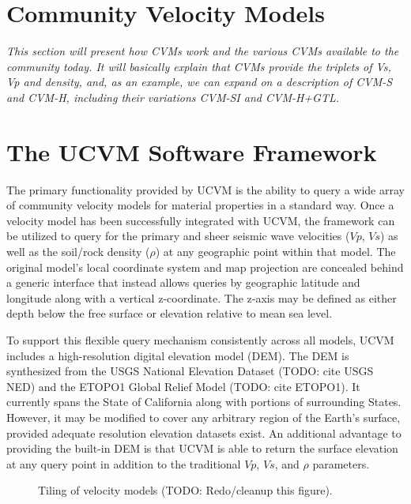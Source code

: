


\section{Community Velocity Models}
\label{sec:cvms}

\textit{
\color{blue}
This section will present how CVMs work and the various CVMs available to the community today. It will basically explain that CVMs provide the triplets of Vs, Vp and density, and, as an example, we can expand on a description of CVM-S and CVM-H, including their variations CVM-SI and CVM-H+GTL.
}

\section{The UCVM Software Framework}\label{sec:ucvm}
The primary functionality provided by UCVM is the ability to query a wide array of community velocity models for material properties in a standard way. Once a velocity model has been successfully integrated with UCVM, the framework can be utilized to query for the primary and sheer seismic wave velocities ($Vp$, $Vs$) as well as the soil/rock density ($\rho$) at any geographic point within that model. The original model's local coordinate system and map projection are concealed behind a generic interface that instead allows queries by geographic latitude and longitude along with a vertical z-coordinate. The z-axis may be defined as either depth below the free surface or elevation relative to mean sea level.

To support this flexible query mechanism consistently across all models, UCVM includes a high-resolution digital elevation model (DEM). The DEM is synthesized from the USGS National Elevation Dataset (TODO: cite USGS NED) and the ETOPO1 Global Relief Model (TODO: cite ETOPO1). It currently spans the State of California along with portions of surrounding States. However, it may be modified to cover any arbitrary region of the Earth's surface, provided adequate resolution elevation datasets exist. An additional advantage to providing the built-in DEM is that UCVM is able to return the surface elevation at any query point in addition to the traditional $Vp$, $Vs$, and $\rho$ parameters.
\begin{figure}
\centering
{}
\caption{Tiling of velocity models (TODO: Redo/cleanup this figure).}\label{fig:tiling}
\end{figure}

